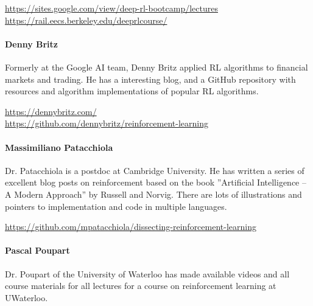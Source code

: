 \begin{tcolorbox}[colback=code]
\footnotesize
\url{https://sites.google.com/view/deep-rl-bootcamp/lectures} \\

\url{https://rail.eecs.berkeley.edu/deeprlcourse/}
\end{tcolorbox}


\paragraph*{Denny Britz}

Formerly at the Google AI team, Denny Britz applied RL algorithms to financial markets and trading. He has a interesting blog, and a GitHub repository with resources and algorithm implementations of popular RL algorithms. \\

\begin{tcolorbox}[colback=code]
\footnotesize
\url{https://dennybritz.com/} \\

\url{https://github.com/dennybritz/reinforcement-learning}
\end{tcolorbox}


\paragraph*{Massimiliano Patacchiola} 

Dr. Patacchiola is a postdoc at Cambridge University. He has written a series of excellent blog posts on reinforcement based on the book ''Artificial Intelligence -- A Modern Approach'' by Russell and Norvig. There are lots of illustrations and pointers to implementation and code in multiple languages. \\

\begin{tcolorbox}[colback=code]
\footnotesize
\url{https://github.com/mpatacchiola/dissecting-reinforcement-learning}
\end{tcolorbox}

\paragraph*{Pascal Poupart}

Dr. Poupart of the University of Waterloo has made available videos and all course materials for all lectures for a course on reinforcement learning at UWaterloo. \\

